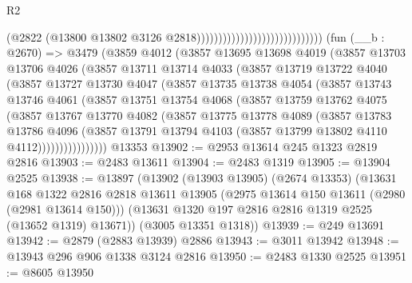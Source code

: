 \begin{lexlean}{R2}
\begin{coremodule}
                                                          (@2822
                                                            (@13800
                                                              @13802
                                                              @3126
                                                              @2818)))))))))))))))))))))))))))))
    (fun (__b : @2670) =>
    @3479
      (@3859
        @4012
        (@3857
          @13695
          @13698
          @4019
          (@3857
            @13703
            @13706
            @4026
            (@3857
              @13711
              @13714
              @4033
              (@3857
                @13719
                @13722
                @4040
                (@3857
                  @13727
                  @13730
                  @4047
                  (@3857
                    @13735
                    @13738
                    @4054
                    (@3857
                      @13743
                      @13746
                      @4061
                      (@3857
                        @13751
                        @13754
                        @4068
                        (@3857
                          @13759
                          @13762
                          @4075
                          (@3857
                            @13767
                            @13770
                            @4082
                            (@3857
                              @13775
                              @13778
                              @4089
                              (@3857
                                @13783
                                @13786
                                @4096
                                (@3857
                                  @13791
                                  @13794
                                  @4103
                                  (@3857 @13799 @13802 @4110 @4112))))))))))))))))
    @13353
@13902 := @2953 @13614 @245 @1323 @2819 @2816
@13903 := @2483 @13611
@13904 := @2483 @1319
@13905 := @13904 @2525
@13938 := @13897
    (@13902
      (@13903 @13905)
      (@2674 @13353)
      (@13631
        @168
        @1322
        @2816
        @2818
        @13611
        @13905
        (@2975 @13614 @150 @13611 (@2980 (@2981 @13614 @150)))
        (@13631 @1320 @197 @2816 @2816 @1319 @2525 (@13652 @1319) @13671))
      (@3005 @13351 @1318))
@13939 := @249 @13691
@13942 := @2879 (@2883 @13939) @2886
@13943 := @3011 @13942
@13948 := @13943 @296 @906 @1338 @3124 @2816
@13950 := @2483 @1330 @2525
@13951 := @8605 @13950

\end{coremodule}
\end{lexlean}
